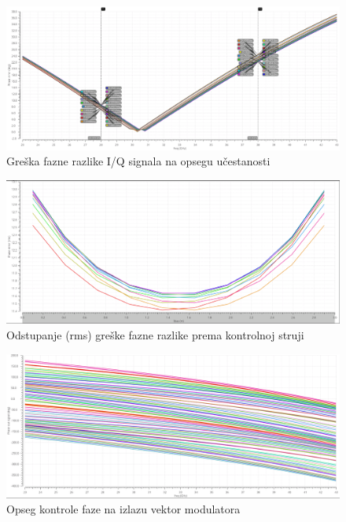 \documentclass[journal,twocolumn,letterpaper]{IEEEJERM}
\begin{document}
\begin{figure}[!htbp]
  \centering
  \includegraphics[width=\linewidth]{phase_error.png}
  \caption{Greška fazne razlike I/Q signala na opsegu učestanosti}
  \label{fig:phase_error}
\end{figure}

\begin{figure}[!htbp]
  \centering
  \includegraphics[width=\linewidth]{phase_error_rms.png}
  \caption{Odstupanje (rms) greške fazne razlike prema kontrolnoj struji}
  \label{fig:phase_error_rms}
\end{figure}

\begin{figure}[!htbp]
  \centering
  \includegraphics[width=\linewidth]{phase_out_signal.png}
  \caption{Opseg kontrole faze na izlazu vektor modulatora}
  \label{fig:phase_out_signal}
\end{figure}
\end{document}
